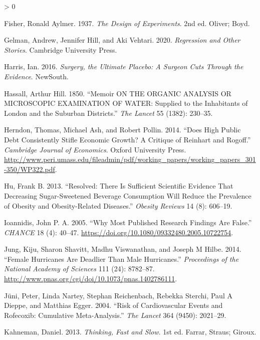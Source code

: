 \documentclass[
  10pt,
  b5paper]{book}
\newlength{\cslhangindent}
\newenvironment{CSLReferences}[2] %
 {%
  \setlength{\parindent}{0pt}
  \ifodd #1 \everypar{\setlength{\hangindent}{\cslhangindent}}\ignorespaces\fi
  \ifnum #2 > 0
  \setlength{\parskip}{#2\baselineskip}
  \fi
 }%
 {}
\begin{document}
\begin{CSLReferences}{1}{0}
\leavevmode\hypertarget{ref-fisher_1937}{}%
Fisher, Ronald Aylmer. 1937. \emph{The Design of Experiments}. 2nd ed. Oliver; Boyd.

\leavevmode\hypertarget{ref-gelman2020regression}{}%
Gelman, Andrew, Jennifer Hill, and Aki Vehtari. 2020. \emph{Regression and Other Stories}. Cambridge University Press.

\leavevmode\hypertarget{ref-harris2016book}{}%
Harris, Ian. 2016. \emph{Surgery, the Ultimate Placebo: A Surgeon Cuts Through the Evidence}. NewSouth.

\leavevmode\hypertarget{ref-hassall1850memoir}{}%
Hassall, Arthur Hill. 1850. {``Memoir ON THE ORGANIC ANALYSIS OR MICROSCOPIC EXAMINATION OF WATER: Supplied to the Inhabitants of London and the Suburban Districts.''} \emph{The Lancet} 55 (1382): 230--35.

\leavevmode\hypertarget{ref-herndon2014does}{}%
Herndon, Thomas, Michael Ash, and Robert Pollin. 2014. {``Does High Public Debt Consistently Stifle Economic Growth? A Critique of Reinhart and Rogoff.''} \emph{Cambridge Journal of Economics}. Oxford University Press. \url{http://www.peri.umass.edu/fileadmin/pdf/working_papers/working_papers_301-350/WP322.pdf}.

\leavevmode\hypertarget{ref-hu2013resolved}{}%
Hu, Frank B. 2013. {``Resolved: There Is Sufficient Scientific Evidence That Decreasing Sugar-Sweetened Beverage Consumption Will Reduce the Prevalence of Obesity and Obesity-Related Diseases.''} \emph{Obesity Reviews} 14 (8): 606--19.

\leavevmode\hypertarget{ref-r19_ioannidis_2005}{}%
Ioannidis, John P. A. 2005. {``Why Most Published Research Findings Are False.''} \emph{CHANCE} 18 (4): 40--47. \url{https://doi.org/10.1080/09332480.2005.10722754}.

\leavevmode\hypertarget{ref-jung2014female}{}%
Jung, Kiju, Sharon Shavitt, Madhu Viswanathan, and Joseph M Hilbe. 2014. {``Female Hurricanes Are Deadlier Than Male Hurricanes.''} \emph{Proceedings of the National Academy of Sciences} 111 (24): 8782--87. \url{http://www.pnas.org/cgi/doi/10.1073/pnas.1402786111}.

\leavevmode\hypertarget{ref-juni2004risk}{}%
Jüni, Peter, Linda Nartey, Stephan Reichenbach, Rebekka Sterchi, Paul A Dieppe, and Matthias Egger. 2004. {``Risk of Cardiovascular Events and Rofecoxib: Cumulative Meta-Analysis.''} \emph{The Lancet} 364 (9450): 2021--29.

\leavevmode\hypertarget{ref-kahneman_2013}{}%
Kahneman, Daniel. 2013. \emph{Thinking, Fast and Slow}. 1st ed. Farrar, Straus; Giroux.


\end{CSLReferences}
\end{document}
